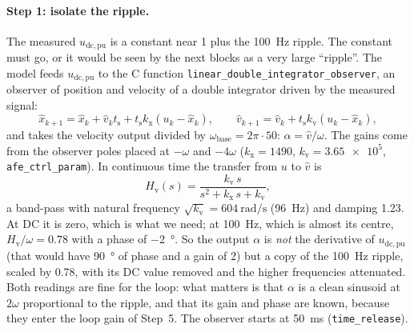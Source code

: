 \documentclass[11pt,a4paper]{scrartcl}
\newcommand{\ped}[1]{_{\mathrm{#1}}}
\newcommand{\code}[1]{\texttt{#1}}
\begin{document}
\begin{onehalfspace}
\paragraph{Step 1: isolate the ripple.}
The measured $u\ped{dc,pu}$ is a constant near 1 plus the \SI{100}{\hertz} ripple. The constant must go, or it would be seen by the next blocks as a very large ``ripple''. The model feeds $u\ped{dc,pu}$ to the C function \code{linear\_double\_integrator\_observer}, an observer of position and velocity of a double integrator driven by the measured signal:
\begin{equation}
	\hat x_{k+1} = \hat x_k + \hat v_k t\ped{s} + t\ped{s} k\ped{x} (u_k - \hat x_k), \qquad
	\hat v_{k+1} = \hat v_k + t\ped{s} k\ped{v} (u_k - \hat x_k),
	\label{eq:observer}
\end{equation}
and takes the velocity output divided by $\omega\ped{base} = 2\pi\cdot 50$: $\alpha = \hat v/\omega$. The gains come from the observer poles placed at $-\omega$ and $-4\omega$ ($k\ped{x} = 1490$, $k\ped{v} = \num{3.65e5}$, \code{afe\_ctrl\_param}). In continuous time the transfer from $u$ to $\hat v$ is
\begin{equation}
	H\ped{v}(s) = \frac{k\ped{v}\, s}{s^2 + k\ped{x}\, s + k\ped{v}},
	\label{eq:Hv}
\end{equation}
a band-pass with natural frequency $\sqrt{k\ped{v}} = \SI{604}{\radian\per\second}$ (\SI{96}{\hertz}) and damping 1.23. At DC it is zero, which is what we need; at \SI{100}{\hertz}, which is almost its centre, $H\ped{v}/\omega = 0.78$ with a phase of \SI{-2}{\degree}. So the output $\alpha$ is \emph{not} the derivative of $u\ped{dc,pu}$ (that would have \SI{90}{\degree} of phase and a gain of 2) but a copy of the \SI{100}{\hertz} ripple, scaled by 0.78, with its DC value removed and the higher frequencies attenuated. Both readings are fine for the loop: what matters is that $\alpha$ is a clean sinusoid at $2\omega$ proportional to the ripple, and that its gain and phase are known, because they enter the loop gain of Step~5. The observer starts at \SI{50}{\milli\second} (\code{time\_release}).


\end{onehalfspace}
\end{document}
